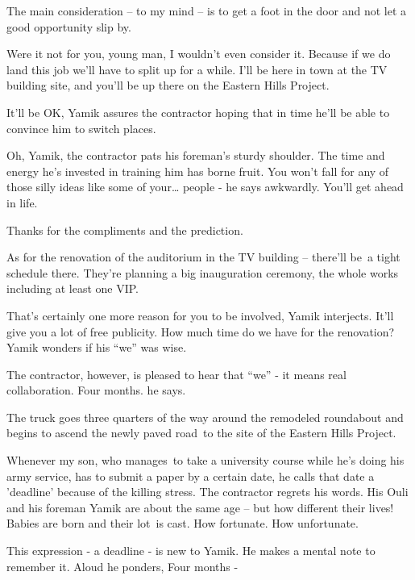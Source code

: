 \documentclass[twoside,11pt]{book}
\begin{document}
{\textquotedbl}The main consideration -- to my mind -- is to get a foot in the door and not let a good opportunity slip
by.{\textquotedbl} \ 

{\textquotedbl}Were it not for you, young man, I wouldn't even consider it. Because if we do land this job we'll have to
split up for a while. I'll be here in town at the TV building site, and you'll be up there on the Eastern Hills
Project.{\textquotedbl} 

{\textquotedbl}It'll be OK,{\textquotedbl} Yamik assures the contractor hoping that in time he'll be able to convince
him to switch places.\ ~

{\textquotedbl}Oh, Yamik,{\textquotedbl} the contractor pats his foreman's sturdy shoulder. The time and energy he's
invested in training him has borne fruit. {\textquotedbl}You won't fall for any of those silly ideas like some of
your{\dots} people -{\textquotedbl} he says awkwardly. {\textquotedbl}You'll get ahead in life.{\textquotedbl} 

{\textquotedbl}Thanks for the compliments and the prediction.{\textquotedbl} 

{\textquotedbl}As for the renovation of the auditorium in the TV building -- there'll be~a tight schedule there. They're
planning a big inauguration ceremony, the whole works including at least one VIP.{\textquotedbl} 

{\textquotedbl}That's certainly one more reason for you to be involved,{\textquotedbl} Yamik interjects.
{\textquotedbl}It'll give you a lot of free publicity. How much time do we have for the renovation?{\textquotedbl}
Yamik wonders if his ``we'' was wise.

The contractor, however, is pleased to hear that ``we'' - it means real collaboration. {\textquotedbl}Four
months.{\textquotedbl} he says.\ 

The truck goes three quarters of the way around the remodeled roundabout and begins to ascend the newly paved road~to
the site of the Eastern Hills Project. 

{\textquotedbl}Whenever my son, who manages{\ }to take a university course while he's doing his army
service, has to submit a paper by a certain date, he calls that date a 'deadline' because of the killing
stress.{\textquotedbl} The contractor regrets his words. His Ouli and his foreman Yamik are about the same age -- but
how different their lives! Babies are born and their lot~is cast. How fortunate. How unfortunate.

This expression - {\textquotedbl}a deadline{\textquotedbl} - is new to Yamik. He makes a mental note to remember it.
Aloud he ponders, {\textquotedbl}Four months -{\textquotedbl}
\end{document}
